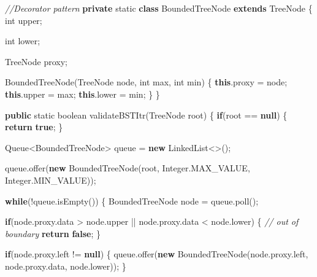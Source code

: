 \documentclass[]{book}
\newenvironment{Shaded}{\begin{snugshade}}{\end{snugshade}}
\newcommand{\BuiltInTok}[1]{#1}
\newcommand{\CommentTok}[1]{\textcolor[rgb]{0.56,0.35,0.01}{\textit{#1}}}
\newcommand{\DataTypeTok}[1]{\textcolor[rgb]{0.13,0.29,0.53}{#1}}
\newcommand{\FunctionTok}[1]{\textcolor[rgb]{0.00,0.00,0.00}{#1}}
\newcommand{\KeywordTok}[1]{\textcolor[rgb]{0.13,0.29,0.53}{\textbf{#1}}}
\newcommand{\NormalTok}[1]{#1}
\begin{document}
\begin{Shaded}
\begin{Highlighting}[]
\CommentTok{//Decorator pattern}
\KeywordTok{private} \DataTypeTok{static} \KeywordTok{class}\NormalTok{ BoundedTreeNode }\KeywordTok{extends} \BuiltInTok{TreeNode}\NormalTok{ \{}
    \DataTypeTok{int}\NormalTok{ upper;}

    \DataTypeTok{int}\NormalTok{ lower;}

    \BuiltInTok{TreeNode}\NormalTok{ proxy;}

    \FunctionTok{BoundedTreeNode}\NormalTok{(}\BuiltInTok{TreeNode}\NormalTok{ node, }\DataTypeTok{int}\NormalTok{ max, }\DataTypeTok{int}\NormalTok{ min) \{}
        \KeywordTok{this}\NormalTok{.}\FunctionTok{proxy}\NormalTok{ = node;}
        \KeywordTok{this}\NormalTok{.}\FunctionTok{upper}\NormalTok{ = max;}
        \KeywordTok{this}\NormalTok{.}\FunctionTok{lower}\NormalTok{ = min;}
\NormalTok{    \}}
\NormalTok{\}}


\KeywordTok{public} \DataTypeTok{static} \DataTypeTok{boolean} \FunctionTok{validateBSTItr}\NormalTok{(}\BuiltInTok{TreeNode}\NormalTok{ root) \{}
    \KeywordTok{if}\NormalTok{(root == }\KeywordTok{null}\NormalTok{) \{}
        \KeywordTok{return} \KeywordTok{true}\NormalTok{;}
\NormalTok{    \}}

    \BuiltInTok{Queue}\NormalTok{<BoundedTreeNode> queue = }\KeywordTok{new} \BuiltInTok{LinkedList}\NormalTok{<>();}

\NormalTok{    queue.}\FunctionTok{offer}\NormalTok{(}\KeywordTok{new} \FunctionTok{BoundedTreeNode}\NormalTok{(root, }\BuiltInTok{Integer}\NormalTok{.}\FunctionTok{MAX_VALUE}\NormalTok{, }\BuiltInTok{Integer}\NormalTok{.}\FunctionTok{MIN_VALUE}\NormalTok{));}

    \KeywordTok{while}\NormalTok{(!queue.}\FunctionTok{isEmpty}\NormalTok{()) \{}
\NormalTok{        BoundedTreeNode node = queue.}\FunctionTok{poll}\NormalTok{();}


        \KeywordTok{if}\NormalTok{(node.}\FunctionTok{proxy}\NormalTok{.}\FunctionTok{data}\NormalTok{ > node.}\FunctionTok{upper}\NormalTok{ || node.}\FunctionTok{proxy}\NormalTok{.}\FunctionTok{data}\NormalTok{ < node.}\FunctionTok{lower}\NormalTok{) \{}
            \CommentTok{// out of boundary}
            \KeywordTok{return} \KeywordTok{false}\NormalTok{;}
\NormalTok{        \}}

        \KeywordTok{if}\NormalTok{(node.}\FunctionTok{proxy}\NormalTok{.}\FunctionTok{left}\NormalTok{ != }\KeywordTok{null}\NormalTok{) \{}
\NormalTok{            queue.}\FunctionTok{offer}\NormalTok{(}\KeywordTok{new} \FunctionTok{BoundedTreeNode}\NormalTok{(node.}\FunctionTok{proxy}\NormalTok{.}\FunctionTok{left}\NormalTok{, node.}\FunctionTok{proxy}\NormalTok{.}\FunctionTok{data}\NormalTok{, node.}\FunctionTok{lower}\NormalTok{));}
\NormalTok{        \}}


\end{Highlighting}
\end{Shaded}
\end{document}
